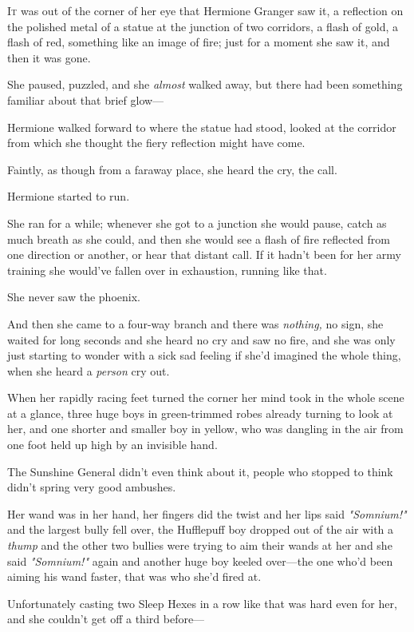 
\lettrine{I}{t} was out of the
corner of her eye that Hermione Granger saw it, a reflection on the polished
metal of a statue at the junction of two corridors, a flash of gold, a flash of
red, something like an image of fire; just for a moment she saw it, and then it
was gone.

She paused, puzzled, and she \emph{almost} walked away, but there had been
something familiar about that brief glow\mbox{---}

Hermione walked forward to where the statue had stood, looked at the corridor
from which she thought the fiery reflection might have come.

Faintly, as though from a faraway place, she heard the cry, the call.

Hermione started to run.

She ran for a while; whenever she got to a junction she would pause, catch as
much breath as she could, and then she would see a flash of fire reflected from
one direction or another, or hear that distant call. If it hadn't been for her
army training she would've fallen over in exhaustion, running like that.

She never saw the phoenix.

And then she came to a four-way branch and there was \emph{nothing,} no sign,
she waited for long seconds and she heard no cry and saw no fire, and she was
only just starting to wonder with a sick sad feeling if she'd imagined the
whole thing, when she heard a \emph{person} cry out.

When her rapidly racing feet turned the corner her mind took in the whole scene
at a glance, three huge boys in green-trimmed robes already turning to look at
her, and one shorter and smaller boy in yellow, who was dangling in the air
from one foot held up high by an invisible hand.

The Sunshine General didn't even think about it, people who stopped to think
didn't spring very good ambushes.

Her wand was in her hand, her fingers did the twist and her lips said
\emph{"Somnium!"} and the largest bully fell over, the Hufflepuff boy dropped
out of the air with a \emph{thump} and the other two bullies were trying to aim
their wands at her and she said \emph{"Somnium!"} again and another huge boy
keeled over---the one who'd been aiming his wand faster, that was who she'd
fired at.

Unfortunately casting two Sleep Hexes in a row like that was hard even for her,
and she couldn't get off a third before\mbox{---}

